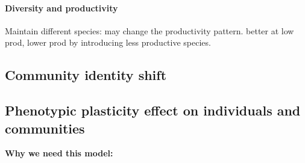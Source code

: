 \paragraph{Diversity and productivity}
Maintain different species: may change the productivity pattern. better at low prod, lower prod by introducing less productive species.


\subsection{Community identity shift}

\textbf{}


\subsection{Phenotypic plasticity effect on individuals and communities}

\textbf{Why we need this model: }




